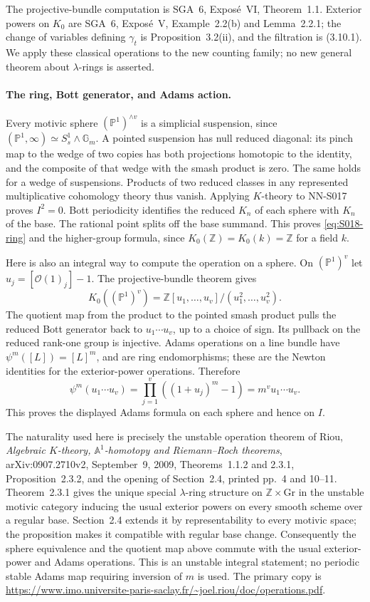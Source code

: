The projective-bundle computation is SGA~6, Expos\'e~VI,
Theorem~1.1. Exterior powers on $K_0$ are SGA~6, Expos\'e~V,
Example~2.2(b) and Lemma~2.2.1; the change of variables defining
$\gamma_t$ is Proposition~3.2(ii), and the filtration is (3.10.1).
We apply these classical operations to the new counting family;
no new general theorem about $\lambda$-rings is asserted.

\paragraph{The ring, Bott generator, and Adams action.}
Every motivic sphere $(\mathbb P^1)^{\wedge v}$ is a simplicial
suspension, since $(\mathbb P^1,\infty)\simeq S_s^1\wedge\mathbb G_m$.
A pointed suspension has null reduced diagonal: its pinch map to the
wedge of two copies has both projections homotopic to the identity,
and the composite of that wedge with the smash product is zero.
The same holds for a wedge of suspensions. Products of two reduced
classes in any represented multiplicative cohomology theory thus
vanish. Applying $K$-theory to NN-S017 proves $I^2=0$.
Bott periodicity identifies the reduced $K_n$ of each sphere with
$K_n$ of the base. The rational point splits off the base summand.
This proves \eqref{eq:S018-ring} and the higher-group formula,
since $K_0(\mathbb Z)=K_0(k)=\mathbb Z$ for a field $k$.

Here is also an integral way to compute the operation on a sphere.
On $(\mathbb P^1)^v$ let $u_j=[\mathcal O(1)_j]-1$.
The projective-bundle theorem gives
\[
 K_0((\mathbb P^1)^v)=
       \mathbb Z[u_1,\ldots,u_v]/(u_1^2,\ldots,u_v^2).
\]
The quotient map from the product to the pointed smash product
pulls the reduced Bott generator back to $u_1\cdots u_v$, up to
a choice of sign. Its pullback on the reduced rank-one group is
injective. Adams operations on a line bundle have
$\psi^m([L])=[L]^m$, and are ring endomorphisms; these are the
Newton identities for the exterior-power operations. Therefore
\[
 \psi^m(u_1\cdots u_v)=
       \prod_{j=1}^v((1+u_j)^m-1)=m^v u_1\cdots u_v.
\]
This proves the displayed Adams formula on each sphere and hence on $I$.

The naturality used here is precisely the unstable operation theorem
of Riou, \emph{Algebraic $K$-theory, $\mathbb A^1$-homotopy and
Riemann--Roch theorems}, arXiv:0907.2710v2, September~9, 2009,
Theorems~1.1.2 and 2.3.1, Proposition~2.3.2, and the opening of
Section~2.4, printed pp.~4 and 10--11. Theorem~2.3.1 gives the
unique special $\lambda$-ring structure on $\mathbb Z\times\mathrm{Gr}$
in the unstable motivic category inducing the usual exterior
powers on every smooth scheme over a regular base. Section~2.4
extends it by representability to every motivic space; the
proposition makes it compatible with regular base change.
Consequently the sphere equivalence and the quotient map above
commute with the usual exterior-power and Adams operations.
This is an unstable integral statement; no periodic stable Adams
map requiring inversion of $m$ is used. The primary copy is
\url{https://www.imo.universite-paris-saclay.fr/~joel.riou/doc/operations.pdf}.

